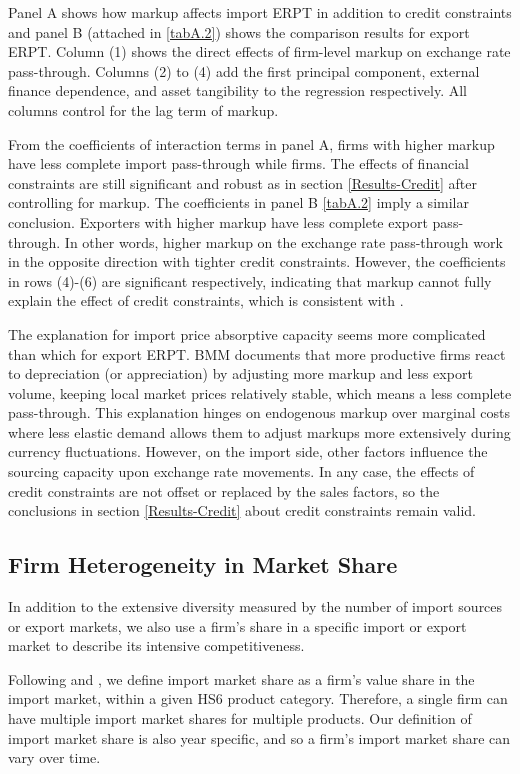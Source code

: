 \documentclass[12pt]{article}
\begin{document}
Panel A shows how markup affects import ERPT in addition to credit constraints and panel B (attached in \ref{tabA.2}) shows the comparison results for export ERPT. Column (1) shows the direct effects of firm-level markup on exchange rate pass-through. Columns (2) to (4) add the first principal component, external finance dependence, and asset tangibility to the regression respectively. All columns control for the lag term of markup.

From the coefficients of interaction terms in panel A, firms with higher markup have less complete import pass-through while firms. The effects of financial constraints are still significant and robust as in section \ref{Results-Credit} after controlling for markup. The coefficients in panel B \ref{tabA.2} imply a similar conclusion. Exporters with higher markup have less complete export pass-through. In other words, higher markup on the exchange rate pass-through work in the opposite direction with tighter credit constraints. However, the coefficients in rows (4)-(6) are significant respectively, indicating that markup cannot fully explain the effect of credit constraints, which is consistent with \cite{xu-guo2021}.

The explanation for import price absorptive capacity seems more complicated than which for export ERPT. BMM\cite{bmm2012} documents that more productive firms react to depreciation (or appreciation) by adjusting more markup and less export volume, keeping local market prices relatively stable, which means a less complete pass-through. This explanation hinges on endogenous markup over marginal costs where less elastic demand allows them to adjust markups more extensively during currency fluctuations. However, on the import side, other factors influence the sourcing capacity upon exchange rate movements. In any case, the effects of credit constraints are not offset or replaced by the sales factors, so the conclusions in section \ref{Results-Credit} about credit constraints remain valid.

\subsection{Firm Heterogeneity in Market Share}
In addition to the extensive diversity measured by the number of import sources or export markets, we also use a firm's share in a specific import or export market to describe its intensive competitiveness.

Following \cite{aik2014} and \cite{devereux2017}, we define import market share as a firm’s value share in the import market, within a given HS6 product category. Therefore, a single firm can have multiple import market shares for multiple products. Our definition of import market share is also year specific, and so a firm’s import market share can vary over time. 
\end{document}
